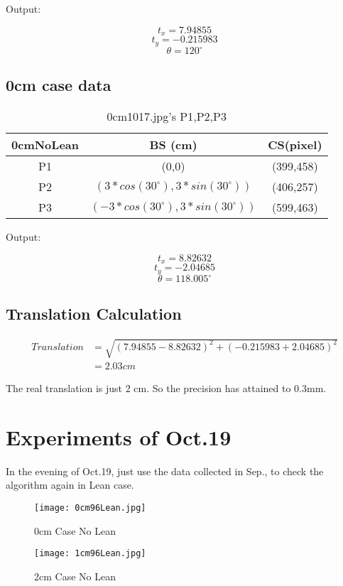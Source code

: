 \documentclass[letterpaper, 10 pt, conference]{ieeeconf}  %
\theoremstyle{remark}
\begin{document}
Output:

$$t_x=7.94855$$
$$t_y=-0.215983$$
$$\theta=120^\circ$$


\subsection{0cm case data}

 
\begin{table}[h]
\caption{0cm1017.jpg's P1,P2,P3 }
\label{table_example}
\begin{center}
\begin{tabular}{|c|c|c|}

\hline
0cmNoLean & BS (cm)& CS(pixel)\\
\hline

P1 & (0,0)& (399,458) \\
\hline

P2 & $(3*cos(30^\circ),3*sin(30^\circ))$ & (406,257) \\

\hline
P3 & $(-3*cos(30^\circ),3*sin(30^\circ))$ & (599,463)\\
\hline
\end{tabular}
\end{center}
\end{table}

Output:

$$t_x=8.82632$$
$$t_y=-2.04685$$
$$\theta=118.005^\circ$$

\subsection{Translation Calculation}
\begin{equation}
\begin{aligned}
Translation&=\sqrt{ (7.94855-8.82632)^2 +(-0.215983 + 2.04685)^2}\\
		   &=2.03 cm
\end{aligned}
\end{equation}

The real translation is just 2 cm. So the precision has attained to 0.3mm. 


\section{Experiments of Oct.19}
In the evening of Oct.19, just use the data collected in Sep., to check the algorithm again in Lean case.

    \begin{figure}  
    \begin{minipage}[t]{0.5\linewidth}  
    \centering  
    \texttt{[image: 0cm96Lean.jpg]}  
    \caption{0cm Case No Lean}  
    \label{fig:side:a}  
    \end{minipage}%
    \begin{minipage}[t]{0.5\linewidth}  
    \centering  
    \texttt{[image: 1cm96Lean.jpg]}  
    \caption{2cm Case No Lean}  
    \label{fig:side:b}  
    \end{minipage}  
    \end{figure}  
\end{document}
